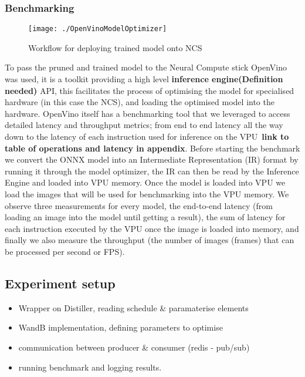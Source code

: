 \documentclass[../Dissertation.tex]{subfiles}
\begin{document}
\subsubsection{Benchmarking}

\begin{figure}[H]
	\centering
	\texttt{[image: ./OpenVinoModelOptimizer]}
	\caption{Workflow for deploying trained model onto NCS~\autocite{ModelOptimizerDeveloper}}
	\label{fig:OpenVinoWorkflow}
\end{figure}


To pass the pruned and trained model to the Neural Compute stick OpenVino was used, it is a toolkit providing a high level \textbf{inference engine(Definition needed)} API, this facilitates the process of optimising the model for specialised hardware (in this case the NCS), and loading the optimised model into the hardware. 
OpenVino itself has a benchmarking tool that we leveraged to access detailed latency and throughput metrics; from end to end latency all the way down to the latency of each instruction used for inference on the VPU~\textbf{link to table of operations and latency in appendix}. 
Before starting the benchmark we convert the ONNX model into an Intermediate Representation (IR) format by running it through the model optimizer, the IR can then be read by the Inference Engine and loaded into VPU memory.
Once the model is loaded into VPU we load the images that will be used for benchmarking into the VPU memory.
We observe three measurements for every model, the end-to-end latency (from loading an image into the model until getting a result), the sum of latency for each instruction executed by the VPU once the image is loaded into memory, and finally we also measure the throughput (the number of images (frames) that can be processed per second or FPS).

\subsection{Experiment setup}
\begin{itemize}
    \item Wrapper on Distiller, reading schedule \& paramaterise elements
    \item WandB implementation, defining parameters to optimise
    \item communication between producer \& consumer (redis - pub/sub)
    \item running benchmark and logging results.
\end{itemize}
\end{document}
